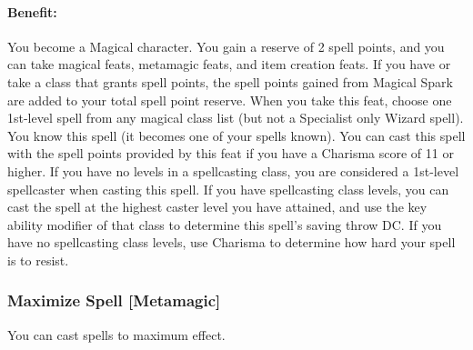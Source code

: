 \paragraph{Benefit:}
You become a Magical character. You gain a reserve of 2 spell points, and you can take
magical feats, metamagic feats, and item creation feats.
If you have or take a class that grants spell points, the spell
points gained from Magical Spark are added to your total spell
point reserve.
When you take this feat, choose one 1st-level spell from any
magical class list (but not a Specialist only Wizard spell).
You know this spell (it becomes one of your
spells known). You can cast this spell with the spell
points provided by this feat if you have a Charisma score of 11
or higher. If you have no levels in a spellcasting class, you are considered
a 1st-level spellcaster when casting this spell. If you have
spellcasting class levels, you can cast the spell at the highest
caster level you have attained, and use the key ability modifier of that class to determine this spell's saving throw DC.
If you have no spellcasting class levels, use Charisma to determine how hard your spell is to resist.

\subsubsection[Maximize Spell]{Maximize Spell [Metamagic]}
\label{Feat:MaximizeSpell}
You can cast spells to maximum effect.

